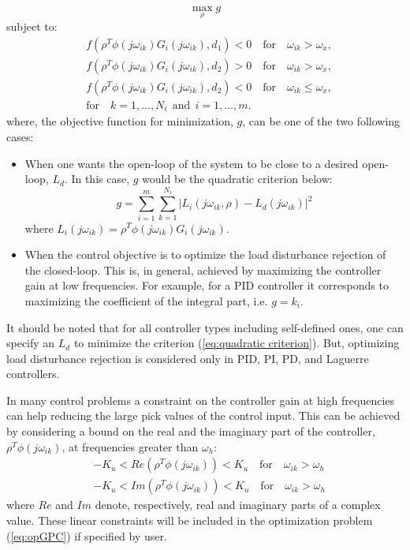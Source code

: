 \documentclass [12pt , a4paper] {article}
\begin{document}
 \[
\max_\rho{g}
\]
subject to:
\begin{align}
\label{eq:opGPC}
& f(\rho^T \phi(j\omega_{ik})G_i(j\omega_{ik}),d_1)<0 \quad \mbox{for} \quad \omega_{ik}>\omega_x, \nonumber \\
& f(\rho^T \phi(j\omega_{ik})G_i(j\omega_{ik}),d_2)>0 \quad \mbox{for} \quad \omega_{ik}>\omega_x,  \\
& f(\rho^T \phi(j\omega_{ik})G_i(j\omega_{ik}),d_2)<0 \quad \mbox{for} \quad \omega_{ik} \leqslant \omega_x, \nonumber \\
& \mbox{for} \quad k=1,\ldots,N_i \:\: \mbox{and} \:\: i=1,\ldots,m. \nonumber
\end{align}
where, the objective function for minimization, $g$, can be one of the two following cases:
\begin{itemize}
\item When one wants the open-loop of the system to be close to a desired open-loop, $L_d$. In this case, $g$ would be the quadratic criterion below:
\begin{equation}
g=\sum_{i=1}^{m}\sum_{k=1}^{N_i} |L_i(j\omega_{ik},\rho)-L_d(j\omega_{ik})|^2
\label{eq:quadratic criterion}
\end{equation}
where $L_i(j\omega_{ik})=\rho^T \phi(j\omega_{ik})G_i(j\omega_{ik})$.

\item When the control objective is to optimize the load disturbance rejection of the closed-loop. This is, in general, achieved by maximizing the controller gain at low frequencies. For example, for a PID controller it corresponds to maximizing the coefficient of the integral part, i.e. $g = k_i$.
\end{itemize}

It should be noted that for all controller types including self-defined ones, one can specify an $L_d$ to minimize the criterion (\ref{eq:quadratic criterion}). But, optimizing load disturbance rejection is considered only in PID, PI, PD, and Laguerre controllers.

In many control problems a constraint on the controller gain at high frequencies can help reducing the large pick values of the control input. This can be achieved by considering a bound on the real and the imaginary part of the controller, $\rho^T\phi(j\omega_{ik})$, at frequencies greater than $\omega_h$:
\begin{align}
& -K_u<Re(\rho^T \phi(j\omega_{ik}))<K_u \quad \mbox{for} \quad \omega_{ik} > \omega_h \nonumber \\
& -K_u<Im(\rho^T \phi(j\omega_{ik}))<K_u \quad \mbox{for} \quad \omega_{ik} > \omega_h 
\label{eq:Kuwh}
\end{align} 
where $Re$ and $Im$ denote, respectively, real and imaginary parts of a complex value. These linear constraints will be included in the optimization problem (\ref{eq:opGPC}) if specified by user.
\end{document}
